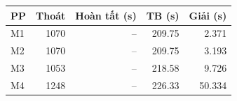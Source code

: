 \begin{center}\small
\begin{tabular}{lrrrr}
\toprule
PP & Thoát & Hoàn tất (s) & TB (s) & Giải (s)\\\midrule
M1 & 1070 & -- & 209.75 & 2.371\\
M2 & 1070 & -- & 209.75 & 3.193\\
M3 & 1053 & -- & 218.58 & 9.726\\
M4 & 1248 & -- & 226.33 & 50.334\\
\bottomrule\end{tabular}\end{center}